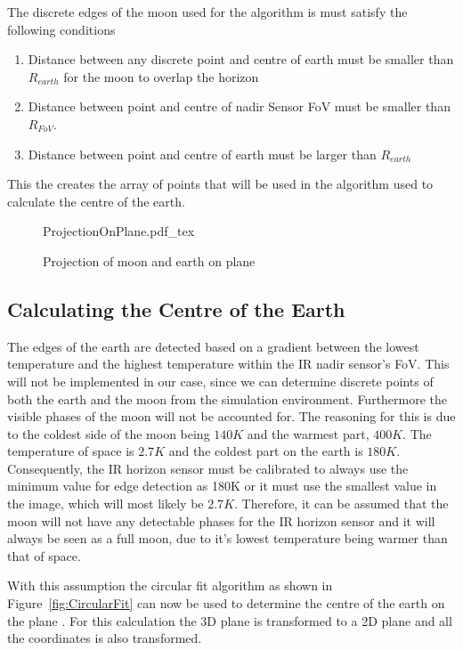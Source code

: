 The discrete edges of the moon used for the algorithm is must satisfy the following conditions
\begin{enumerate}
	\item Distance between any discrete point and centre of earth must be smaller than $R_{earth}$ for the moon to overlap the horizon
	\item Distance between point and centre of nadir Sensor FoV must be smaller than $R_{FoV}$.
	\item Distance between point and centre of earth must be larger than $R_{earth}$
\end{enumerate}

This the creates the array of points that will be used in the algorithm used to calculate the centre of the earth.

\begin{figure}[!hbt]
	\centering
	\def\svgwidth{14cm}
	{ProjectionOnPlane.pdf_tex}
	\caption{Projection of moon and earth on plane}
	\label{fig:ProjectionOnPlane}
\end{figure}

\subsection{Calculating the Centre of the Earth}
\label{section: Calculating the Centre of the Earth}
The edges of the earth are detected based on a gradient between the lowest temperature and the highest temperature within the IR nadir sensor's FoV. This will not be implemented in our case, since we can determine discrete points of both the earth and the moon from the simulation environment. Furthermore the visible phases of the moon will not be accounted for. The reasoning for this is due to the coldest side of the moon being $140K$ and the warmest part, $400K$. The temperature of space is $2.7K$ and the coldest part on the earth is $180K$. Consequently, the IR horizon sensor must be calibrated to always use the minimum value for edge detection as 180K or it must use the smallest value in the image, which will most likely be $2.7K$. Therefore, it can be assumed that the moon will not have any detectable phases for the IR horizon sensor and it will always be seen as a full moon, due to it's lowest temperature being warmer than that of space. 

With this assumption the circular fit algorithm as shown in Figure~\ref{fig:CircularFit} can now be used to determine the centre of the earth on the plane \cite{Wessels2018}. For this calculation the 3D plane is transformed to a 2D plane and all the coordinates is also transformed.  

